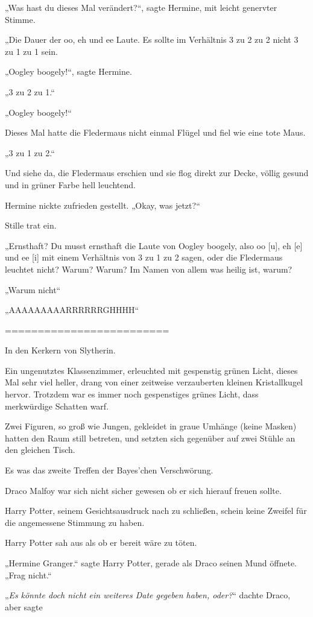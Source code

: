 {„Was hast du dieses Mal verändert?“, sagte Hermine, mit leicht genervter Stimme.

„Die Dauer der oo, eh und ee Laute. Es sollte im Verhältnis 3 zu 2 zu 2 nicht 3 zu 1 zu 1 sein.

„Oogley boogely!“, sagte Hermine.

„3 zu 2 zu 1.“

„Oogley boogely!“

Dieses Mal hatte die Fledermaus nicht einmal Flügel und fiel wie eine tote Maus.

„3 zu 1 zu 2.“

Und siehe da, die Fledermaus erschien und sie flog direkt zur Decke, völlig gesund und in grüner Farbe hell leuchtend.

Hermine nickte zufrieden gestellt. „Okay, was jetzt?“

Stille trat ein.

„Ernsthaft? Du musst ernsthaft die Laute von Oogley boogely, also oo {[}u{]}, eh {[}e{]} und ee {[}i{]} mit einem Verhältnis von 3 zu 1 zu 2 sagen, oder die Fledermaus leuchtet nicht? Warum? Warum? Im Namen von allem was heilig ist, warum?

„Warum nicht“

„AAAAAAAAARRRRRRGHHHH“

=========================

In den Kerkern von Slytherin.

Ein ungenutztes Klassenzimmer, erleuchted mit gespenstig grünen Licht, dieses Mal sehr viel heller, drang von einer zeitweise verzauberten kleinen Kristallkugel hervor. Trotzdem war es immer noch gespenstiges grünes Licht, dass merkwürdige Schatten warf.

Zwei Figuren, so groß wie Jungen, gekleidet in graue Umhänge (keine Masken) hatten den Raum still betreten, und setzten sich gegenüber auf zwei Stühle an den gleichen Tisch.

Es was das zweite Treffen der Bayes'chen Verschwörung.

Draco Malfoy war sich nicht sicher gewesen ob er sich hierauf freuen sollte.

Harry Potter, seinem Gesichtsausdruck nach zu schließen, schein keine Zweifel für die angemessene Stimmung zu haben.

Harry Potter sah aus als ob er bereit wäre zu töten.

„Hermine Granger.“ sagte Harry Potter, gerade als Draco seinen Mund öffnete. „Frag nicht.“

„\emph{Es} \emph{könnte doch nicht ein weiteres Date gegeben haben, oder?}“ dachte Draco, aber sagte

}
